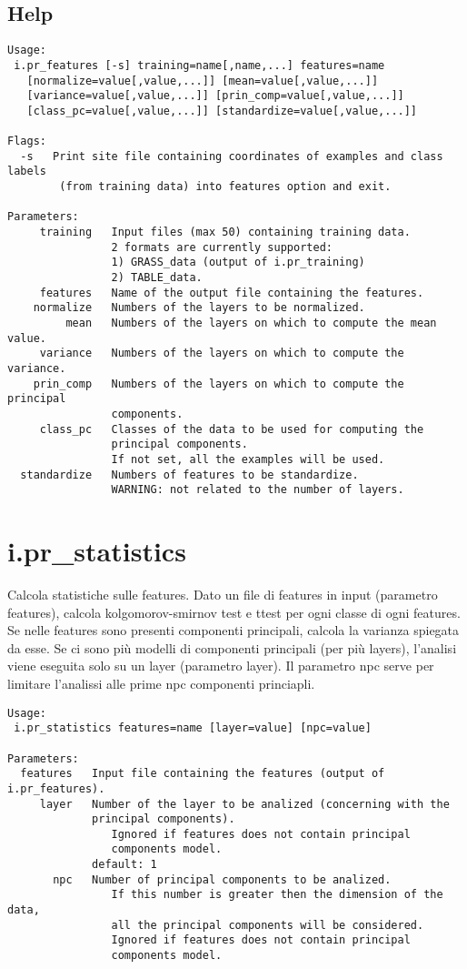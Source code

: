 \subsection*{Help}
\begin{verbatim}
Usage:
 i.pr_features [-s] training=name[,name,...] features=name
   [normalize=value[,value,...]] [mean=value[,value,...]]
   [variance=value[,value,...]] [prin_comp=value[,value,...]]
   [class_pc=value[,value,...]] [standardize=value[,value,...]]

Flags:
  -s   Print site file containing coordinates of examples and class labels
        (from training data) into features option and exit.

Parameters:
     training   Input files (max 50) containing training data.
                2 formats are currently supported:
                1) GRASS_data (output of i.pr_training)
                2) TABLE_data.
     features   Name of the output file containing the features.
    normalize   Numbers of the layers to be normalized.
         mean   Numbers of the layers on which to compute the mean value.
     variance   Numbers of the layers on which to compute the variance.
    prin_comp   Numbers of the layers on which to compute the principal 
                components.
     class_pc   Classes of the data to be used for computing the 
                principal components.
                If not set, all the examples will be used.
  standardize   Numbers of features to be standardize.
                WARNING: not related to the number of layers.
\end{verbatim}

\section{i.pr\_statistics}
Calcola statistiche sulle features. Dato un file di features in input
(parametro features), calcola kolgomorov-smirnov test e t\-test per
ogni classe di ogni features. Se nelle features sono presenti
componenti principali, calcola la varianza spiegata da esse. Se ci
sono pi\`{u} modelli di componenti principali (per pi\`{u} layers),
l'analisi viene eseguita solo su un layer (parametro layer). Il
parametro npc serve per limitare l'analissi alle prime npc componenti
princiapli.

\begin{verbatim}
Usage:
 i.pr_statistics features=name [layer=value] [npc=value]

Parameters:
  features   Input file containing the features (output of i.pr_features).
     layer   Number of the layer to be analized (concerning with the 
             principal components).
                Ignored if features does not contain principal 
                components model.
             default: 1
       npc   Number of principal components to be analized.
                If this number is greater then the dimension of the data,
                all the principal components will be considered.
                Ignored if features does not contain principal 
                components model.
\end{verbatim}

